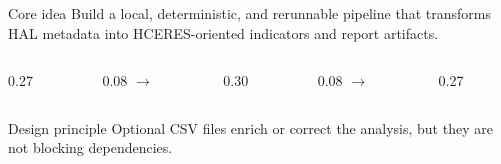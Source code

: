 \begin{frame}[t]

  \begin{block}{Core idea}
    Build a local, deterministic, and rerunnable pipeline that transforms HAL metadata into HCERES-oriented indicators and report artifacts.
  \end{block}

  \vspace{0.6cm}

  \begin{columns}[c,onlytextwidth]
    \begin{column}{0.27\textwidth}
    \end{column}

    \begin{column}{0.08\textwidth}
      \centering
      {\Large\color{inriablue}$\rightarrow$}
    \end{column}

    \begin{column}{0.30\textwidth}
    \end{column}

    \begin{column}{0.08\textwidth}
      \centering
      {\Large\color{inriablue}$\rightarrow$}
    \end{column}

    \begin{column}{0.27\textwidth}
    \end{column}
  \end{columns}

  \vspace{0.6cm}

  \begin{block}{Design principle}
    Optional CSV files enrich or correct the analysis, but they are not blocking dependencies.
  \end{block}
\end{frame}

